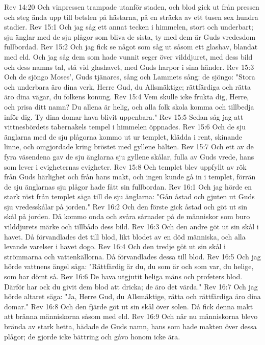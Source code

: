 Rev 14:20  Och vinpressen trampade utanför staden, och blod gick ut från pressen och steg ända upp till betslen på hästarna, på en sträcka av ett tusen sex hundra stadier.
Rev 15:1  Och jag såg ett annat tecken i himmelen, stort och underbart; sju änglar med de sju plågor som bliva de sista, ty med dem är Guds vredesdom fullbordad.
Rev 15:2  Och jag fick se något som såg ut såsom ett glashav, blandat med eld. Och jag såg dem som hade vunnit seger över vilddjuret, med dess bild och dess namns tal, stå vid glashavet, med Guds harpor i sina händer.
Rev 15:3  Och de sjöngo Moses', Guds tjänares, sång och Lammets sång: de sjöngo: "Stora och underbara äro dina verk, Herre Gud, du Allsmäktige; rättfärdiga och rätta äro dina vägar, du folkens konung.
Rev 15:4  Vem skulle icke frukta dig, Herre, och prisa ditt namn? Du allena är helig, och alla folk skola komma och tillbedja inför dig. Ty dina domar hava blivit uppenbara."
Rev 15:5  Sedan såg jag att vittnesbördets tabernakels tempel i himmelen öppnades.
Rev 15:6  Och de sju änglarna med de sju plågorna kommo ut ur templet, klädda i rent, skinande linne, och omgjordade kring bröstet med gyllene bälten.
Rev 15:7  Och ett av de fyra väsendena gav de sju änglarna sju gyllene skålar, fulla av Guds vrede, hans som lever i evigheternas evigheter.
Rev 15:8  Och templet blev uppfyllt av rök från Guds härlighet och från hans makt, och ingen kunde gå in i templet, förrän de sju änglarnas sju plågor hade fått sin fullbordan.
Rev 16:1  Och jag hörde en stark röst från templet säga till de sju änglarna: "Gån åstad och gjuten ut Guds sju vredesskålar på jorden."
Rev 16:2  Och den förste gick åstad och göt ut sin skål på jorden. Då kommo onda och svåra sårnader på de människor som buro vilddjurets märke och tillbådo dess bild.
Rev 16:3  Och den andre göt ut sin skål i havet. Då förvandlades det till blod, likt blodet av en död människa, och alla levande varelser i havet dogo.
Rev 16:4  Och den tredje göt ut sin skål i strömmarna och vattenkällorna. Då förvandlades dessa till blod.
Rev 16:5  Och jag hörde vattnens ängel säga: "Rättfärdig är du, du som är och som var, du helige, som har dömt så.
Rev 16:6  De hava utgjutit heliga mäns och profeters blod. Därför har ock du givit dem blod att dricka; de äro det värda."
Rev 16:7  Och jag hörde altaret säga: "Ja, Herre Gud, du Allsmäktige, rätta och rättfärdiga äro dina domar."
Rev 16:8  Och den fjärde göt ut sin skål över solen. Då fick denna makt att bränna människorna såsom med eld.
Rev 16:9  Och när nu människorna blevo brända av stark hetta, hädade de Guds namn, hans som hade makten över dessa plågor; de gjorde icke bättring och gåvo honom icke ära.
